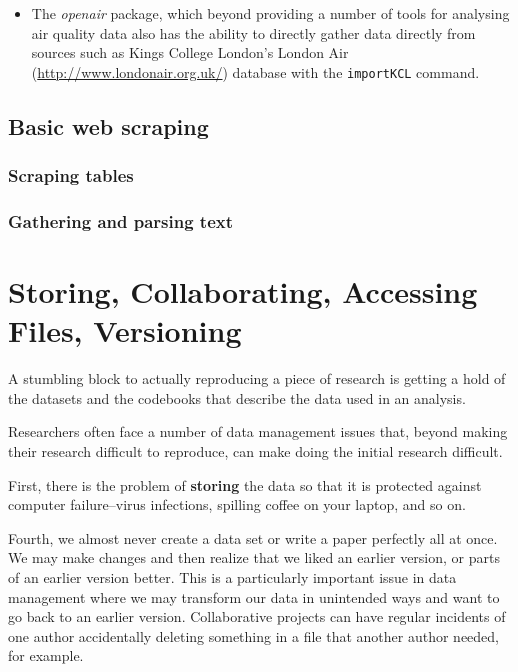 \documentclass[ChapterTOCs,krantz1]{krantz}\usepackage{graphicx, color}
\begin{document}
\begin{itemize}
    \item The \emph{openair} package, which beyond providing a number of tools for analysing air quality data also has the ability to directly gather data directly from sources such as Kings College London's London Air (\url{http://www.londonair.org.uk/}) database with the \texttt{importKCL} command.
\end{itemize}

\section{Basic web scraping}

\subsection{Scraping tables}

\subsection{Gathering and parsing text}





\chapter{Storing, Collaborating, Accessing Files, Versioning}\label{Storing}

A stumbling block to actually reproducing a piece of research is getting a hold of the datasets and the codebooks that describe the data used in
an analysis.

Researchers often face a number of data management issues that, beyond
making their research difficult to reproduce, can make doing the initial
research difficult.

First, there is the problem of \textbf{storing} the data so that it is
protected against computer failure--virus infections, spilling coffee on
your laptop, and so on.

Fourth, we almost never create a data set or write a paper perfectly all
at once. We may make changes and then realize that we liked an earlier
version, or parts of an earlier version better. This is a particularly
important issue in data management where we may transform our data in
unintended ways and want to go back to an earlier version. Collaborative
projects can have regular incidents of one author accidentally deleting
something in a file that another author needed, for example.
\end{document}
